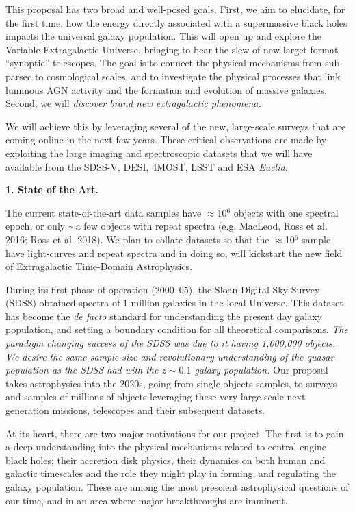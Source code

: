 \documentclass[oneside, a4paper, onecolumn, 11pt]{article}
\begin{document}
\smallskip
\smallskip
\noindent
This proposal has two broad and well-posed goals.  First, we aim to
elucidate, for the first time, how the energy directly associated with
a supermassive black holes impacts the universal galaxy population.
This will open up and explore the Variable Extragalactic Universe,
bringing to bear the slew of new larget format ``synoptic''
telescopes.  The goal is to connect the physical mechanisms from
sub-parsec to cosmological scales, and to investigate the physical
processes that link luminous AGN activity and the formation and
evolution of massive galaxies.  Second, we will {\it discover brand new
extragalactic phenomena.}  

\smallskip
\smallskip
\noindent
We will achieve this by leveraging several of the new, large-scale
surveys that are coming online in the next few years. These critical
observations are made by exploiting the large imaging and
spectroscopic datasets that we will have available from the SDSS-V,
DESI, 4MOST, LSST and ESA {\it Euclid}. 




\medskip
\medskip
\noindent
\large
{\bf{\textcolor{Cerulean}{1. State of the Art.}}}
\normalsize

\noindent
The current state-of-the-art data samples have $\approx$10$^{6}$
objects with one spectral epoch, or only $\sim$a few objects with
repeat spectra (e.g, MacLeod, Ross et al. 2016; Ross et al. 2018).  We
plan to collate datasets so that the $\approx$10$^{6}$ sample have
light-curves and repeat spectra and in doing so, will kickstart the
new field of Extragalactic Time-Domain Astrophysics.

\smallskip
\smallskip
\noindent
During its first phase of operation (2000–05), the Sloan Digital Sky
Survey (SDSS) obtained spectra of 1 million galaxies in the local
Universe. This dataset has become the {\it de facto} standard for
understanding the present day galaxy population, and setting a
boundary condition for all theoretical comparisons.  {\it The paradigm
changing success of the SDSS was due to it having 1,000,000 objects.
We desire the same sample size and revolutionary understanding of the
quasar population as the SDSS had with the $z\sim0.1$ galaxy
population.}  Our proposal takes astrophysics into the 2020s, going
from single objects samples, to surveys and samples of millions of
objects leveraging these very large scale next generation missions,
telescopes and their subsequent datasets.

\smallskip
\smallskip
\noindent
At its heart, there are two major motivations for our project.  The
first is to gain a deep understanding into the physical mechanisms
related to central engine black holes; their accretion disk physics,
their dynamics on both human and galactic timescales and the role they
might play in forming, and regulating the galaxy population. These are
among the most prescient astrophysical questions of our time, and in
an area where major breakthroughs are imminent.
\end{document}
